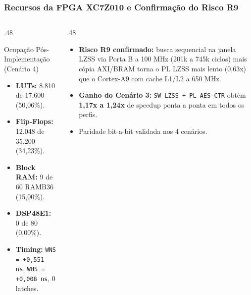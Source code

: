 \documentclass[../main.tex]{subfiles}
\begin{document}
\begin{frame}
  \frametitle{Recursos da FPGA XC7Z010 e Confirma\c{c}\~ao do Risco R9}
  \begin{columns}[T]
    \begin{column}{.48\textwidth}
      \begin{block}{Ocupa\c{c}\~ao P\'os-Implementa\c{c}\~ao (Cen\'ario 4)}
        \begin{itemize}
          \item \textbf{LUTs:} 8.810 de 17.600 (50,06\%).
          \item \textbf{Flip-Flops:} 12.048 de 35.200 (34,23\%).
          \item \textbf{Block RAM:} 9 de 60 RAMB36 (15,00\%).
          \item \textbf{DSP48E1:} 0 de 80 (0,00\%).
          \item \textbf{Timing:} \texttt{WNS = +0,551 ns}, \texttt{WHS = +0,008 ns}, 0 latches.
        \end{itemize}
      \end{block}
    \end{column}
    \begin{column}{.48\textwidth}
      \begin{pontoschave}
        \begin{itemize}
          \item \textbf{Risco R9 confirmado:} busca sequencial na janela LZSS via Porta B a 100 MHz (201k a 745k ciclos) mais c\'opia AXI/BRAM torna o PL LZSS mais lento (0,63x) que o Cortex-A9 com cache L1/L2 a 650 MHz.
          \item \textbf{Ganho do Cen\'ario 3:} \texttt{SW LZSS + PL AES-CTR} obt\'em \textbf{1,17x a 1,24x} de speedup ponta a ponta em todos os perfis.
          \item Paridade bit-a-bit validada nos 4 cen\'arios.
        \end{itemize}
      \end{pontoschave}
    \end{column}
  \end{columns}
\end{frame}
\end{document}
